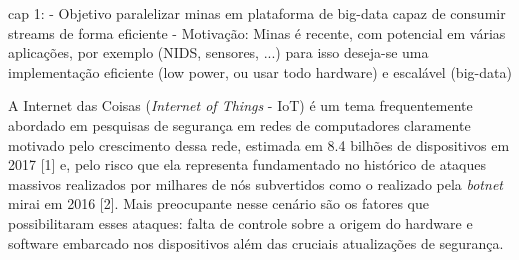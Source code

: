 











cap 1:
    - Objetivo paralelizar minas em plataforma de big-data capaz de consumir streams de forma eficiente
    - Motivação: Minas é recente, com potencial em várias aplicações, por exemplo (NIDS, sensores, ...)
        para isso deseja-se uma implementação eficiente (low power, ou usar todo hardware) e escalável (big-data)

A Internet das Coisas (\emph{Internet of Things} - IoT) é um tema frequentemente
abordado em pesquisas de segurança em redes de computadores claramente motivado
pelo crescimento dessa rede, estimada em 8.4 bilhões de dispositivos em 2017
[1] e, pelo risco que ela representa fundamentado no histórico de ataques
massivos realizados por milhares de nós subvertidos como o realizado pela \emph{botnet}
mirai em 2016 [2]. Mais preocupante nesse cenário são os fatores que
possibilitaram esses ataques: falta de controle sobre a origem do hardware e
software embarcado nos dispositivos além das cruciais atualizações de segurança.

